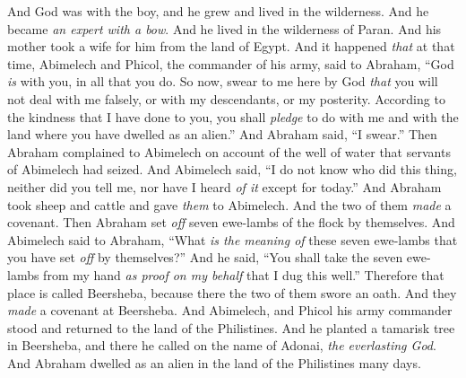 \begin{biblechapter}
\verse And God was with the boy, and he grew and lived in the wilderness. And he became \textit{an expert with a bow}.
\verse And he lived in the wilderness of Paran. And his mother took a wife for him from the land of Egypt.
 And it happened \textit{that} at that time, Abimelech and Phicol, the commander of his army, said to Abraham, “God \textit{is} with you, in all that you do.
\verse So now, swear to me here by God \textit{that} you will not deal with me falsely, or with my descendants, or my posterity. According to the kindness that I have done to you, you shall \textit{pledge} to do with me and with the land where you have dwelled as an alien.”
\verse And Abraham said, “I swear.”
\verse Then Abraham complained to Abimelech on account of the well of water that servants of Abimelech had seized.
\verse And Abimelech said, “I do not know who did this thing, neither did you tell me, nor have I heard \textit{of it} except for today.”
\verse And Abraham took sheep and cattle and gave \textit{them} to Abimelech. And the two of them \textit{made} a covenant.
\verse Then Abraham set \textit{off} seven ewe-lambs of the flock by themselves.
\verse And Abimelech said to Abraham, “What \textit{is the meaning of} these seven ewe-lambs that you have set \textit{off} by themselves?”
\verse And he said, “You shall take the seven ewe-lambs from my hand \textit{as proof on my behalf} that I dug this well.”
\verse Therefore that place is called Beersheba, because there the two of them swore an oath.
\verse And they \textit{made} a covenant at Beersheba. And Abimelech, and Phicol his army commander stood and returned to the land of the Philistines.
\verse And he planted a tamarisk tree in Beersheba, and there he called on the name of Adonai, \textit{the everlasting God}.
\verse And Abraham dwelled as an alien in the land of the Philistines many days.
\end{biblechapter}

